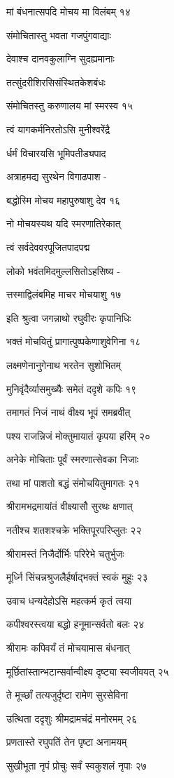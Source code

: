 मां बंधनात्सपदि मोचय मा विलंबम् १४

संमोचितास्तु भवता गजपुंगवाद्याः

देवाश्च दानवकुलाग्नि सुदह्यमानाः

तत्सुंदरीशिरसिसंस्थितकेशबंधः

संमोचितस्तु करुणालय मां स्मरस्व १५

त्वं यागकर्मनिरतोऽसि मुनीश्वरेंद्रै

र्धर्मं विचारयसि भूमिपतीड्यपाद

अत्राहमद्य सुरथेन विगाढपाश -

बद्धोस्मि मोचय महापुरुषाशु देव १६

नो मोचयस्यथ यदि स्मरणातिरेकात्

त्वं सर्वदेववरपूजितपादपद्म

लोको भवंतमिदमुल्लसितोऽहसिष्य -

त्तस्माद्विलंबमिह माचर मोचयाशु १७

इति श्रुत्वा जगन्नाथो रघुवीरः कृपानिधिः

भक्तं मोचयितुं प्रागात्पुष्पकेणाशुवेगिना १८

लक्ष्मणेनानुगेनाथ भरतेन सुशोभितम्

मुनिवृंदैर्व्यासमुख्यैः समेतं ददृशे कपिः १९

तमागतं निजं नाथं वीक्ष्य भूपं समब्रवीत्

पश्य राजन्निजं मोक्तुमायातं कृपया हरिम् २०

अनेके मोचिताः पूर्वं स्मरणात्सेवका निजाः

तथा मां पाशतो बद्धं संमोचयितुमागतः २१

श्रीरामभद्रमायांतं वीक्ष्यासौ सुरथः क्षणात्

नतीश्च शतशश्चक्रे भक्तिपूरपरिप्लुतः २२

श्रीरामस्तं निजैर्दोर्भिः परिरेभे चतुर्भुजः

मूर्ध्नि सिंचन्नश्रुजलैर्हर्षाद्भक्तं स्वकं मुहुः २३

उवाच धन्यदेहोऽसि महत्कर्म कृतं त्वया

कपीश्वरस्त्वया बद्धो हनूमान्सर्वतो बलः २४

श्रीरामः कपिवर्यं तं मोचयामास बंधनात्

मूर्छितांस्तान्भटान्सर्वान्वीक्ष्य दृष्ट्या स्वजीवयत् २५

ते मूर्च्छां तत्यजुर्दृष्टा रामेण सुरसेविना

उत्थिता ददृशुः श्रीमद्रामचंद्रं मनोरमम् २६

प्रणतास्ते रघुपतिं तेन पृष्टा अनामयम्

सुखीभूता नृपं प्रोचुः सर्वं स्वकुशलं नृपाः २७

